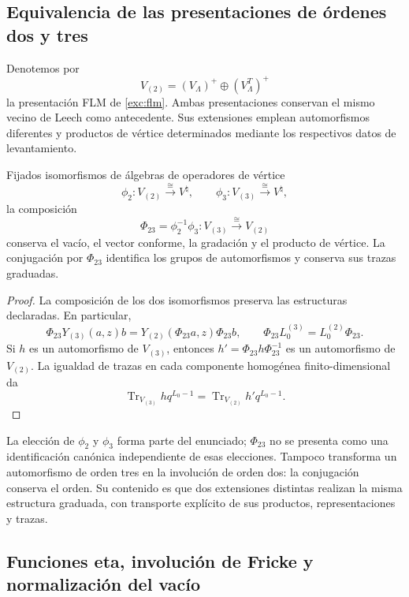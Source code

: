 \subsection{Equivalencia de las presentaciones de órdenes dos y tres}
\label{km:equivalencia-dos-tres}

Denotemos por
\[
 V_{(2)}=(V_\Lambda)^+\oplus(V_\Lambda^T)^+
\]
la presentación FLM de \eqref{exc:flm}. Ambas presentaciones conservan
el mismo vecino de Leech como antecedente. Sus extensiones emplean
automorfismos diferentes y productos de vértice determinados mediante
los respectivos datos de levantamiento.

\begin{theorem}
\label{km:equivalencia-voa}
Fijados isomorfismos de álgebras de operadores de vértice
\[
 \phi_2:V_{(2)}\xrightarrow{\ \cong\ }V^\natural,
 \qquad
 \phi_3:V_{(3)}\xrightarrow{\ \cong\ }V^\natural,
\]
la composición
\begin{equation}
 \Phi_{23}=\phi_2^{-1}\phi_3:
 V_{(3)}\xrightarrow{\ \cong\ }V_{(2)}
 \label{km:Phi23}
\end{equation}
conserva el vacío, el vector conforme, la gradación y el producto de
vértice. La conjugación por \(\Phi_{23}\) identifica los grupos de
automorfismos y conserva sus trazas graduadas.
\end{theorem}
\begin{proof}
La composición de los dos isomorfismos preserva las estructuras
declaradas. En particular,
\[
 \Phi_{23}Y_{(3)}(a,z)b
 =Y_{(2)}(\Phi_{23}a,z)\Phi_{23}b,
 \qquad
 \Phi_{23}L_0^{(3)}=L_0^{(2)}\Phi_{23}.
\]
Si \(h\) es un automorfismo de \(V_{(3)}\), entonces
\(h' =\Phi_{23}h\Phi_{23}^{-1}\) es un automorfismo de
\(V_{(2)}\). La igualdad de trazas en cada componente homogénea
finito-dimensional da
\[
 \operatorname{Tr}_{V_{(3)}}h q^{L_0-1}
 =\operatorname{Tr}_{V_{(2)}}h' q^{L_0-1}.
\]
\end{proof}

La elección de \(\phi_2\) y \(\phi_3\) forma parte del enunciado;
\(\Phi_{23}\) no se presenta como una identificación canónica
independiente de esas elecciones. Tampoco transforma un automorfismo
de orden tres en la involución de orden dos: la conjugación conserva
el orden. Su contenido es que dos extensiones distintas realizan la
misma estructura graduada, con transporte explícito de sus productos,
representaciones y trazas.

\subsection{Funciones eta, involución de Fricke y normalización del vacío}
\label{km:fricke}

